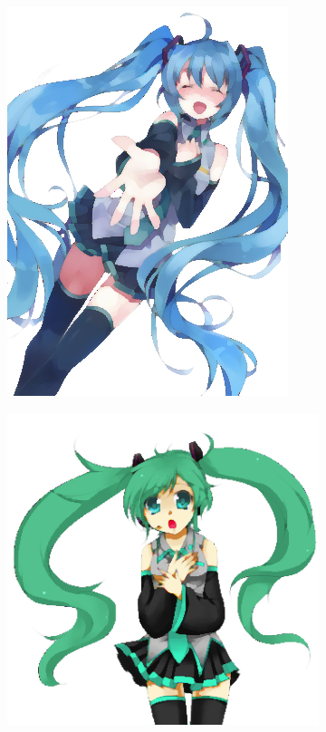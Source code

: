 \documentclass{beamer}
\begin{document}
\begin{frame}
\begin{figure}[htb!]
\centering
\begin{subfigure}{.3\textwidth}
\includegraphics[width=\textwidth]{../images/miku_e.png}
\end{subfigure}
\begin{subfigure}{.3\textwidth}
\includegraphics[width=\textwidth]{../images/miku_c.png}

\end{subfigure}
\end{figure}
\end{frame}
\end{document}
